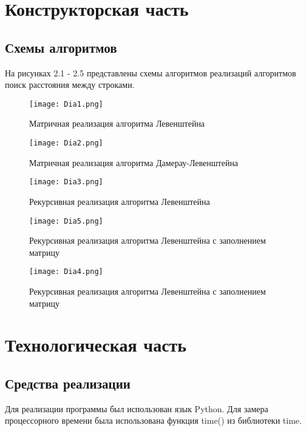 \documentclass[12pt, a4paper]{report}
\begin{document}
	\chapter{Конструкторская часть}
	
	\section{Схемы алгоритмов}
	На рисунках 2.1 - 2.5 представлены схемы алгоритмов реализаций алгоритмов поиск расстояния между строками.
	\begin{figure}[ht!]
		\centering
		\texttt{[image: Dia1.png]}
		\caption{Матричная реализация алгоритма Левенштейна}
		\label{fig:leven}
	\end{figure}

	\begin{figure}[ht!]
		\centering
		\texttt{[image: Dia2.png]}
		\caption{Матричная реализация алгоритма Дамерау-Левенштейна}
		\label{fig:damleven}
	\end{figure}

	\begin{figure}
		\centering
		\texttt{[image: Dia3.png]}
		\caption{Рекурсивная реализация алгоритма Левенштейна}
		\label{fig:reclevenr}
	\end{figure}

	\begin{figure}
		\centering
		\texttt{[image: Dia5.png]}
		\caption{Рекурсивная реализация алгоритма Левенштейна с заполнением матрицу}
		\label{fig:reclevenrtab1}
	\end{figure}

	\begin{figure}
		\centering
		\texttt{[image: Dia4.png]}
		\caption{Рекурсивная реализация алгоритма Левенштейна с заполнением матрицу}
		\label{fig:reclevenrtab2}
	\end{figure}

	\newpage
	
	\chapter{Технологическая часть}
	\section{Средства реализации}
	Для реализации программы был использован язык Python. Для замера процессорного времени была использована функция time() из библиотеки time.
\end{document}
